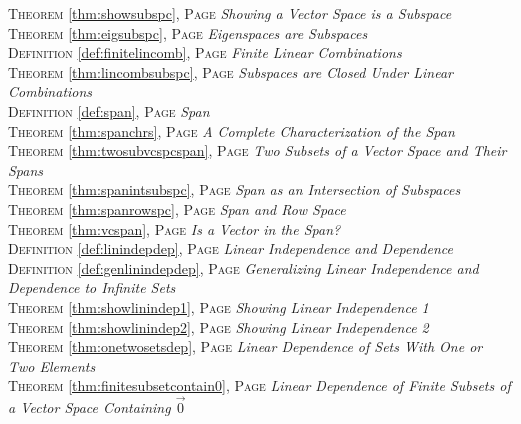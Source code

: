 \begin{multicols}{2}
{\textsc{Theorem} \ref{thm:showsubspc}, \textsc{Page} \pageref{thm:showsubspc} \textit{Showing a Vector Space is a Subspace} \\
\textsc{Theorem} \ref{thm:eigsubspc}, \textsc{Page} \pageref{thm:eigsubspc} \textit{Eigenspaces are Subspaces} \\
\textsc{Definition} \ref{def:finitelincomb}, \textsc{Page} \pageref{def:finitelincomb} \textit{Finite Linear Combinations} \\
\textsc{Theorem} \ref{thm:lincombsubspc}, \textsc{Page} \pageref{thm:lincombsubspc} \textit{Subspaces are Closed Under Linear Combinations} \\
\textsc{Definition} \ref{def:span}, \textsc{Page} \pageref{def:span} \textit{Span} \\
\textsc{Theorem} \ref{thm:spanchrs}, \textsc{Page} \pageref{thm:spanchrs} \textit{A Complete Characterization of the Span} \\
\textsc{Theorem} \ref{thm:twosubvcspcspan}, \textsc{Page} \pageref{thm:twosubvcspcspan} \textit{Two Subsets of a Vector Space and Their Spans} \\
\textsc{Theorem} \ref{thm:spanintsubspc}, \textsc{Page} \pageref{thm:spanintsubspc} \textit{Span as an Intersection of Subspaces} \\
\textsc{Theorem} \ref{thm:spanrowspc}, \textsc{Page} \pageref{thm:spanrowspc} \textit{Span and Row Space} \\
\textsc{Theorem} \ref{thm:vcspan}, \textsc{Page} \pageref{thm:vcspan} \textit{Is a Vector in the Span?} \\
\textsc{Definition} \ref{def:linindepdep}, \textsc{Page} \pageref{def:linindepdep} \textit{Linear Independence and Dependence} \\
\textsc{Definition} \ref{def:genlinindepdep}, \textsc{Page} \pageref{def:genlinindepdep} \textit{Generalizing Linear Independence and Dependence to Infinite Sets} \\
\textsc{Theorem} \ref{thm:showlinindep1}, \textsc{Page} \pageref{thm:showlinindep1} \textit{Showing Linear Independence 1} \\
\textsc{Theorem} \ref{thm:showlinindep2}, \textsc{Page} \pageref{thm:showlinindep2} \textit{Showing Linear Independence 2} \\
\textsc{Theorem} \ref{thm:onetwosetsdep}, \textsc{Page} \pageref{thm:onetwosetsdep} \textit{Linear Dependence of Sets With One or Two Elements} \\
\textsc{Theorem} \ref{thm:finitesubsetcontain0}, \textsc{Page} \pageref{thm:finitesubsetcontain0} \textit{Linear Dependence of Finite Subsets of a Vector Space Containing \(\vec {0}\)} \\
}
\end{multicols}
